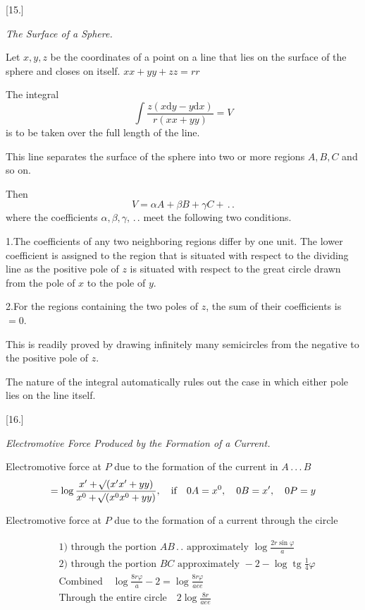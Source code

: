 \begin{center}[15.]\par\medskip\textit{The Surface of a Sphere.}\end{center}
Let $x,y,z$ be the coordinates of a point on a line that lies on the surface of the sphere and closes on itself. $xx+yy+zz=rr$

The integral
\[
\int\frac{z(x\mathrm dy-y\mathrm dx)}{r(xx+yy)}=V
\]
is to be taken over the full length of the line.

This line separates the surface of the sphere into two or more regions $A,B,C$ and so on.

Then
\[
V=\alpha A+\beta B+\gamma C+\,.\,.
\]
where the coefficients $\alpha,\beta,\gamma,\,.\,.$ meet the following two conditions.

1.\quad The coefficients of any two neighboring regions differ by one unit. The lower coefficient is assigned to the region that is situated with respect to the dividing line as the positive pole of $z$ is situated with respect to the great circle drawn from the pole of $x$ to the pole of $y$.

2.\quad For the regions containing the two poles of $z$, the sum of their coefficients is $=0$.

This is readily proved by drawing infinitely many semicircles from the negative to the positive pole of $z$.

The nature of the integral automatically rules out the case in which either pole lies on the line itself.

\begin{center}[16.]\par\medskip\textit{Electromotive Force Produced by the Formation of a Current.}\end{center}
\begin{center}\end{center}
Electromotive force at $P$ due to the formation of the current in $A\, .\, .\, .\, B$
\[
=\log\frac{x'+\mathord{{}^{}\!\surd}(x'x'+yy)}{x^0+\mathord{{}^{}\!\surd}(x^0x^0+yy)},\quad\text{if}\quad0A=x^0,\quad0B=x',\quad0P=y
\]

Electromotive force at $P$ due to the formation of a current through the circle
\begin{center}\end{center}
\[
\begin{aligned}
&\text{1) through the portion }AB\,.\,.\text{ approximately }\log\frac{2r\sin\varphi}{a}\\
&\text{2) through the portion }BC\text{ approximately }-2-\log\operatorname{tg}\tfrac14\varphi\\
&\text{Combined}\quad\log\frac{8r\varphi}{a}-2=\log\frac{8r\varphi}{aee}\\
&\text{Through the entire circle}\quad2\log\frac{8r}{aee}
\end{aligned}
\]

